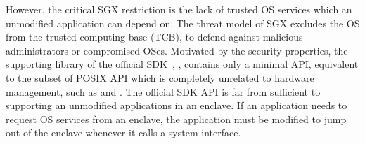 
However, the critical SGX restriction is
the lack of trusted OS services which an unmodified application can depend on.
The threat model of SGX excludes the OS from
the trusted computing base (TCB),
to defend against malicious administrators or compromised OSes.
Motivated by the security properties,
the supporting library of the official SDK~\cite{intel-sgx-sdk}, , contains only a minimal API, equivalent to the subset of POSIX API which is completely unrelated to hardware management, 
such as  and .
The official SDK API is far from sufficient to supporting an unmodified applications in an enclave. 
If an application needs to request OS services from an enclave,
the application must be modified
to jump out of the enclave
whenever it calls a system interface. %


